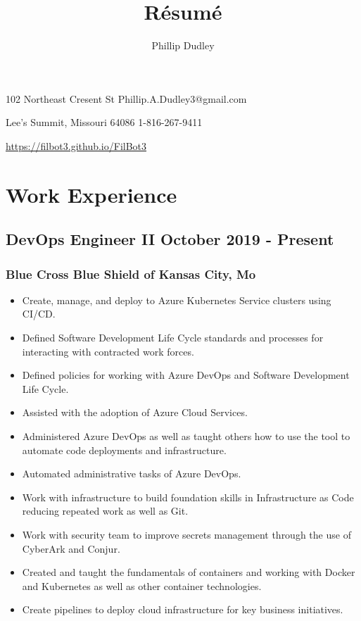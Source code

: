 \documentclass{article}
\title{R\'esum\'e}
\author{Phillip Dudley}
\makeatletter
\renewcommand{\maketitle}{
  \begin{center}
  {\huge\bfseries\theauthor}

  \vspace{.25em}

  102 Northeast Cresent St
  \hfill
  Phillip.A.Dudley3@gmail.com

  Lee's Summit, Missouri 64086
  \hfill
  1-816-267-9411


  \hfill
  \url{https://filbot3.github.io/FilBot3}
\end{center}
}
\makeatother
\begin{document}
  \maketitle

  \section{Work Experience}

    \subsection{DevOps Engineer II {\hfill} October 2019 - Present}

      \subsubsection{Blue Cross Blue Shield of Kansas City, Mo}

        \begin{scriptsize}
        \begin{itemize}

          \item Create, manage, and deploy to Azure Kubernetes Service
            clusters using CI/CD.

          \item Defined Software Development Life Cycle standards and processes
            for interacting with contracted work forces.

          \item Defined policies for working with Azure DevOps and Software
            Development Life Cycle.

          \item Assisted with the adoption of Azure Cloud Services.

          \item Administered Azure DevOps as well as taught others how to use
            the tool to automate code deployments and infrastructure.

          \item Automated administrative tasks of Azure DevOps.

          \item Work with infrastructure to build foundation skills in
            Infrastructure as Code reducing repeated work as well as Git.

          \item Work with security team to improve secrets management through
            the use of CyberArk and Conjur.

          \item Created and taught the fundamentals of containers and working
            with Docker and Kubernetes as well as other container technologies.

          \item Create pipelines to deploy cloud infrastructure for key
            business initiatives.

        \end{itemize}
        \end{scriptsize}
\end{document}
